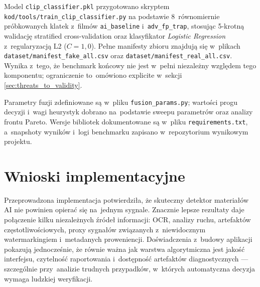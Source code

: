 Model \texttt{clip\_classifier.pkl} przygotowano skryptem
\texttt{kod/tools/train\_clip\_classifier.py} na podstawie 8~równomiernie
próbkowanych klatek z~filmów \texttt{ai\_baseline} i~\texttt{adv\_fp\_trap},
stosując 5-krotną walidację stratified cross-validation oraz klasyfikator
\textit{Logistic Regression} z~regularyzacją L2 ($C=1{,}0$). Pełne manifesty
zbioru znajdują się w~plikach \texttt{dataset/manifest\_fake\_all.csv}
oraz \texttt{dataset/manifest\_real\_all.csv}.
Wynika z~tego, że benchmark końcowy nie jest w~pełni niezależny względem
tego komponentu; ograniczenie to~omówiono explicite w~sekcji
\ref{sec:threats_to_validity}.

Parametry fuzji zdefiniowane są w~pliku \texttt{fusion\_params.py};
wartości progu decyzji i~wagi heurystyk dobrano na~podstawie sweepu parametrów
oraz analizy frontu Pareto.
Wersje bibliotek dokumentowane są w~pliku \texttt{requirements.txt},
a~snapshoty wyników i~logi benchmarku zapisano w~repozytorium wynikowym projektu.

\section{Wnioski implementacyjne}

Przeprowadzona implementacja potwierdziła, że skuteczny detektor materiałów AI
nie powinien opierać się na~jednym sygnale. Znacznie lepsze rezultaty
daje połączenie kilku niezależnych źródeł informacji:
OCR, analizy ruchu, artefaktów częstotliwościowych,
proxy sygnałów związanych z~niewidocznym watermarkingiem i~metadanych proweniencji.
Doświadczenia z~budowy aplikacji pokazują jednocześnie,
że równie ważna jak warstwa algorytmiczna jest jakość
interfejsu, czytelność raportowania i~dostępność
artefaktów diagnostycznych --- szczególnie przy~analizie trudnych
przypadków, w~których automatyczna decyzja wymaga ludzkiej weryfikacji.

